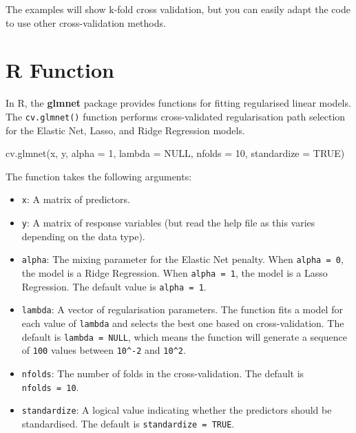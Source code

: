 \documentclass[
  letterpaper,
]{book}
\newenvironment{Shaded}{\begin{snugshade}}{\end{snugshade}}
\newcommand{\AttributeTok}[1]{\textcolor[rgb]{0.40,0.45,0.13}{#1}}
\newcommand{\ConstantTok}[1]{\textcolor[rgb]{0.56,0.35,0.01}{#1}}
\newcommand{\DecValTok}[1]{\textcolor[rgb]{0.68,0.00,0.00}{#1}}
\newcommand{\FunctionTok}[1]{\textcolor[rgb]{0.28,0.35,0.67}{#1}}
\newcommand{\NormalTok}[1]{\textcolor[rgb]{0.00,0.23,0.31}{#1}}
\providecommand{\tightlist}{%
  \setlength{\itemsep}{0pt}\setlength{\parskip}{0pt}}\usepackage{longtable,booktabs,array}
\begin{document}
The examples will show \(\text{k}\)-fold cross validation, but you can
easily adapt the code to use other cross-validation methods.

\section{R Function}\label{sec-r-function}

In R, the \textbf{glmnet} package provides functions for fitting
regularised linear models. The \texttt{cv.glmnet()} function performs
cross-validated regularisation path selection for the Elastic Net,
Lasso, and Ridge Regression models.

\begin{Shaded}
\begin{Highlighting}[]
\FunctionTok{cv.glmnet}\NormalTok{(x, y, }\AttributeTok{alpha =} \DecValTok{1}\NormalTok{, }\AttributeTok{lambda =} \ConstantTok{NULL}\NormalTok{, }\AttributeTok{nfolds =} \DecValTok{10}\NormalTok{,}
          \AttributeTok{standardize =} \ConstantTok{TRUE}\NormalTok{)}
\end{Highlighting}
\end{Shaded}

The function takes the following arguments:

\begin{itemize}
\tightlist
\item
  \texttt{x}: A matrix of predictors.
\item
  \texttt{y}: A matrix of response variables (but read the help file as
  this varies depending on the data type).
\item
  \texttt{alpha}: The mixing parameter for the Elastic Net penalty. When
  \texttt{alpha\ =\ 0}, the model is a Ridge Regression. When
  \texttt{alpha\ =\ 1}, the model is a Lasso Regression. The default
  value is \texttt{alpha\ =\ 1}.
\item
  \texttt{lambda}: A vector of regularisation parameters. The function
  fits a model for each value of \texttt{lambda} and selects the best
  one based on cross-validation. The default is
  \texttt{lambda\ =\ NULL}, which means the function will generate a
  sequence of \texttt{100} values between \texttt{10\^{}-2} and
  \texttt{10\^{}2}.
\item
  \texttt{nfolds}: The number of folds in the cross-validation. The
  default is \texttt{nfolds\ =\ 10}.
\item
  \texttt{standardize}: A logical value indicating whether the
  predictors should be standardised. The default is
  \texttt{standardize\ =\ TRUE}.
\end{itemize}
\end{document}
